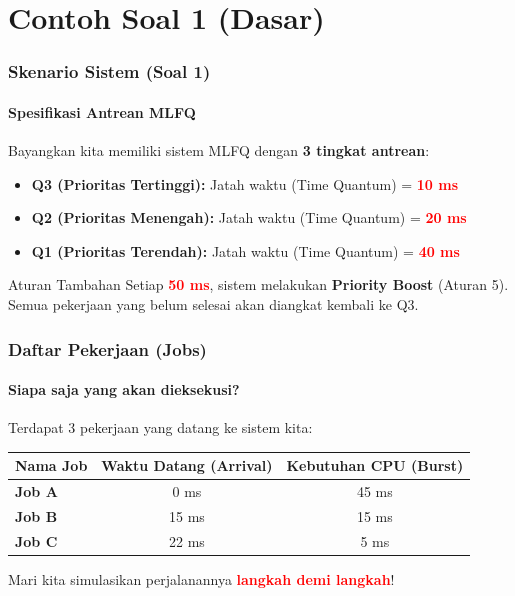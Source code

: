\documentclass[t,aspectratio=169,xcolor=dvipsnames]{beamer}
\newcommand{\tem}[1]{\textbf{\textcolor{red}{#1}}}
\begin{document}
\section{Contoh Soal 1 (Dasar)}

\begin{frame}
    \frametitle{Skenario Sistem (Soal 1)}
    \framesubtitle{Spesifikasi Antrean MLFQ}
    \small
    Bayangkan kita memiliki sistem MLFQ dengan \textbf{3 tingkat antrean}:
    \vspace{0.3cm}
    \begin{itemize}
        \item \textbf{Q3 (Prioritas Tertinggi):} Jatah waktu (Time Quantum) = \tem{10 ms}
        \item \textbf{Q2 (Prioritas Menengah):} Jatah waktu (Time Quantum) = \tem{20 ms}
        \item \textbf{Q1 (Prioritas Terendah):} Jatah waktu (Time Quantum) = \tem{40 ms}
    \end{itemize}
    \vspace{0.3cm}
    \begin{alertblock}{Aturan Tambahan}
        Setiap \tem{50 ms}, sistem melakukan \textbf{Priority Boost} (Aturan 5). Semua pekerjaan yang belum selesai akan diangkat kembali ke Q3.
    \end{alertblock}
\end{frame}

\begin{frame}
    \frametitle{Daftar Pekerjaan (Jobs)}
    \framesubtitle{Siapa saja yang akan dieksekusi?}
    \small
    Terdapat 3 pekerjaan yang datang ke sistem kita:
    \vspace{0.3cm}
    \begin{table}[]
        \centering
        \begin{tabular}{lcc}
            \toprule
            \textbf{Nama Job} & \textbf{Waktu Datang (Arrival)} & \textbf{Kebutuhan CPU (Burst)} \\
            \midrule
            \textbf{Job A} & 0 ms & 45 ms \\
            \textbf{Job B} & 15 ms & 15 ms \\
            \textbf{Job C} & 22 ms & 5 ms \\
            \bottomrule
        \end{tabular}
    \end{table}
    \vspace{0.3cm}
    Mari kita simulasikan perjalanannya \tem{langkah demi langkah}!
\end{frame}
\end{document}
